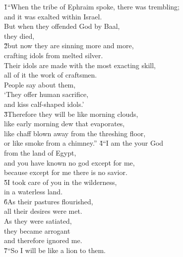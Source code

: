 \begin{poetry}
\poeml {}
\v{1}``When the tribe of Ephraim spoke, there was trembling; \\
\poemll    and it was exalted within Israel. \\
\poeml But when they offended God by Baal, \\
\poemll    they died, \\
\poeml \v{2}but now they are sinning more and more, \\
\poemll    crafting idols from melted silver. \\
\poeml Their idols are made with the most exacting skill, \\
\poemll    all of it the work of craftsmen. \\
\poeml People say about them, \\
\poemll    `They offer human sacrifice, \\
\poemlll       and kiss calf-shaped idols.' \\
\poeml \v{3}Therefore they will be like morning clouds, \\
\poemll    like early morning dew that evaporates, \\
\poeml like chaff blown away from the threshing floor, \\
\poemll    or like smoke from a chimney.''
\poeml \v{4}``I am the  your God \\
\poemll    from the land of Egypt, \\
\poeml and you have known no god except for me, \\
\poemll    because except for me there is no savior. \\
\poeml \v{5}I took care of you in the wilderness, \\
\poemll    in a waterless land. \\
\poeml \v{6}As their pastures flourished, \\
\poemll    all their desires were met. \\
\poeml As they were satiated, \\
\poemll    they became arrogant \\
\poemlll       and therefore ignored me. \\
\poeml \v{7}``So I will be like a lion to them. \\

\end{poetry}
